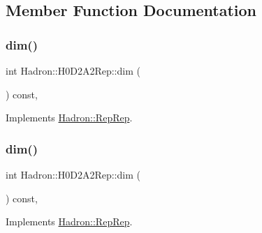 \subsection{Member Function Documentation}
\mbox{\label{structHadron_1_1H0D2A2Rep_adb95283717eaea61e9e0681f2b9dda63}} 
\subsubsection{\texorpdfstring{dim()}{dim()}\hspace{0.1cm}{\footnotesize\ttfamily [1/5]}}
{\footnotesize\ttfamily int Hadron\+::\+H0\+D2\+A2\+Rep\+::dim (\begin{DoxyParamCaption}{ }\end{DoxyParamCaption}) const\hspace{0.3cm}{\ttfamily [inline]}, {\ttfamily [virtual]}}



Implements \mbox{\hyperlink{structHadron_1_1RepRep_a92c8802e5ed7afd7da43ccfd5b7cd92b}{Hadron\+::\+Rep\+Rep}}.

\mbox{\label{structHadron_1_1H0D2A2Rep_adb95283717eaea61e9e0681f2b9dda63}} 
\subsubsection{\texorpdfstring{dim()}{dim()}\hspace{0.1cm}{\footnotesize\ttfamily [2/5]}}
{\footnotesize\ttfamily int Hadron\+::\+H0\+D2\+A2\+Rep\+::dim (\begin{DoxyParamCaption}{ }\end{DoxyParamCaption}) const\hspace{0.3cm}{\ttfamily [inline]}, {\ttfamily [virtual]}}



Implements \mbox{\hyperlink{structHadron_1_1RepRep_a92c8802e5ed7afd7da43ccfd5b7cd92b}{Hadron\+::\+Rep\+Rep}}.

\mbox{\label{structHadron_1_1H0D2A2Rep_adb95283717eaea61e9e0681f2b9dda63}} 

